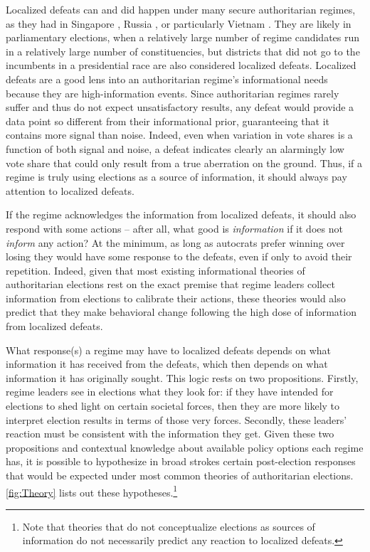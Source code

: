 \documentclass[12pt]{article}
\newcommand\fnote[1]{\footnote{\baselineskip=2\normalbaselineskip#1}}
\newcommand{\1}{\mathbbm{1}}
\begin{document}
Localized defeats can and did happen under many secure authoritarian regimes, as they had in Singapore \citep{Ortmann2011, Miller2015}, Russia \citep{Gelman2013}, or particularly Vietnam \citep{MaleskySchuler2011}. They are likely in parliamentary elections, when a relatively large number of regime candidates run in a relatively large number of constituencies, but districts that did not go to the incumbents in a presidential race are also considered localized defeats. Localized defeats are a good lens into an authoritarian regime's informational needs because they are high-information events. Since authoritarian regimes rarely suffer and thus do not expect unsatisfactory results, any defeat would provide a data point so different from their informational prior, guaranteeing that it contains more signal than noise. Indeed, even when variation in vote shares is a function of both signal and noise, a defeat indicates clearly an alarmingly low vote share that could only result from a true aberration on the ground. Thus, if a regime is truly using elections as a source of information, it should always pay attention to localized defeats. 

If the regime acknowledges the information from localized defeats, it should also respond with some actions -- after all, what good is \textit{information} if it does not \textit{inform} any action? At the minimum, as long as autocrats prefer winning over losing they would have some response to the defeats, even if only to avoid their repetition. Indeed, given that most existing informational theories of authoritarian elections rest on the exact premise that regime leaders collect information from elections to calibrate their actions, these theories would also predict that they make behavioral change following the high dose of information from localized defeats. 

What response(s) a regime may have to localized defeats depends on what information it has received from the defeats, which then depends on what information it has originally sought. This logic rests on two propositions. Firstly, regime leaders see in elections what they look for: if they have intended for elections to shed light on certain societal forces, then they are more likely to interpret election results in terms of those very forces. Secondly, these leaders' reaction must be consistent with the information they get. Given these two propositions and contextual knowledge about available policy options each regime has, it is possible to hypothesize in broad strokes certain post-election responses that would be expected under most common theories of authoritarian elections. \autoref{fig:Theory} lists out these hypotheses.\fnote{Note that theories that do not conceptualize elections as sources of information \citep[e.g][]{AR2005, Cox2009} do not necessarily predict any reaction to localized defeats.}
\end{document}

